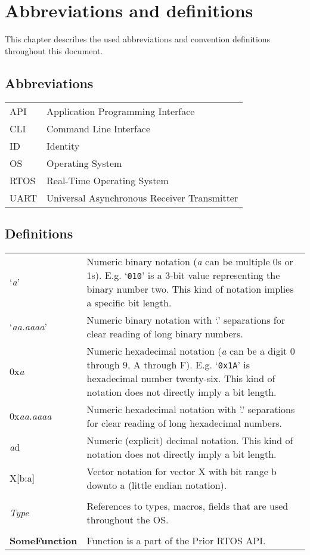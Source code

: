 \chapter{Abbreviations and definitions}


This chapter describes the used abbreviations and convention definitions throughout this document.

\section{Abbreviations}

\begin{tabularx}{\textwidth}{lX}
	API & Application Programming Interface\\
	CLI & Command Line Interface\\
	ID & Identity\\
	OS & Operating System\\
	RTOS & Real-Time Operating System\\
	UART & Universal Asynchronous Receiver Transmitter\\
\end{tabularx}%

\section{Definitions}

\begin{tabularx}{\textwidth}{p{3cm}X}
	`\textit{a}'             & Numeric binary notation (\textit{a} can be multiple 0s or 1s). E.g. `\texttt{010}' is a 3-bit value representing the binary number two. This kind of notation implies a specific bit length.\\
	`\textit{aa.aaaa}'       & Numeric binary notation with `.' separations for clear reading of long binary numbers.\\
	0x\textit{a}             & Numeric hexadecimal notation (\textit{a} can be a digit 0 through 9, A through F). E.g. `\texttt{0x1A}' is hexadecimal number twenty-six. This kind of notation does not directly imply a bit length.\\
	0x\textit{aa.aaaa}       & Numeric hexadecimal notation with '.' separations for clear reading of long hexadecimal numbers.\\
	\textit{a}d              & Numeric (explicit) decimal notation. This kind of notation does not directly imply a bit length.\\
	X[b:a]                   & Vector notation for vector X with bit range b downto a (little endian notation).\\ 
	\\
	\textit{Type}			& References to types, macros, fields that are used throughout the OS.\\
	\\
	\textbf{SomeFunction}   & Function is a part of the Prior RTOS API.\\
\end{tabularx}%
